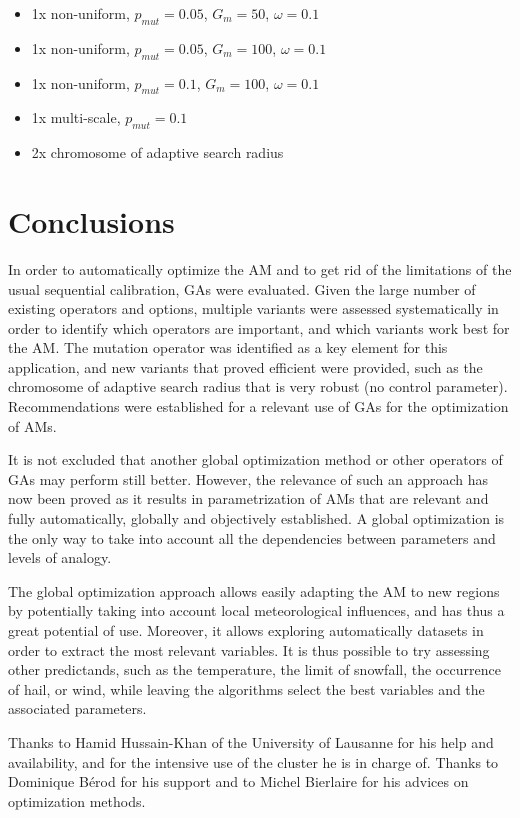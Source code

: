 \documentclass{ametsoc}
\begin{document}
\begin{itemize}
	\setlength\itemsep{-4px}
	\item 1x non-uniform, $p_{mut}=0.05$, $G_{m}=50$, $\omega=0.1$
	\item 1x non-uniform, $p_{mut}=0.05$, $G_{m}=100$, $\omega=0.1$
	\item 1x non-uniform, $p_{mut}=0.1$, $G_{m}=100$, $\omega=0.1$
	\item 1x multi-scale,  $p_{mut}=0.1$
	\item 2x chromosome of adaptive search radius
\end{itemize}


\section{Conclusions}

In order to automatically optimize the AM and to get rid of the limitations of the usual sequential calibration, GAs were evaluated. Given the large number of existing operators and options, multiple variants were assessed systematically in order to identify which operators are important, and which variants work best for the AM. The mutation operator was identified as a key element for this application, and new variants that proved efficient were provided, such as the chromosome of adaptive search radius that is very robust (no control parameter). Recommendations were established for a relevant use of GAs for the optimization of AMs. 

It is not excluded that another global optimization method or other operators of GAs may perform still better. However, the relevance of such an approach has now been proved as it results in parametrization of AMs that are relevant and fully automatically, globally and objectively established. A global optimization is the only way to take into account all the dependencies between parameters and levels of analogy.

The global optimization approach allows easily adapting the AM to new regions by potentially taking into account local meteorological influences, and has thus a great potential of use. Moreover, it allows exploring automatically datasets in order to extract the most relevant variables. It is thus possible to try assessing other predictands, such as the temperature, the limit of snowfall, the occurrence of hail, or wind, while leaving the algorithms select the best variables and the associated parameters.


%
\acknowledgments
Thanks to Hamid Hussain-Khan of the University of Lausanne for his help and availability, and for the intensive use of the cluster he is in charge of. Thanks to Dominique B\'{e}rod for his support and to Michel Bierlaire for his advices on optimization methods.
\end{document}
